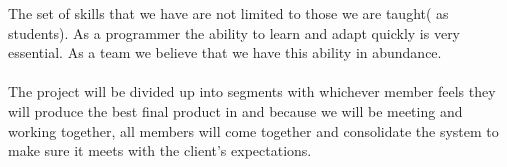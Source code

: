 \documentclass[runningheads,a4paper]{article}
\begin{document}
    The set of skills that we have are not limited to those we are taught( as students). As a programmer the ability to learn and adapt quickly is very essential. As a team we believe that we have this ability in abundance. \\
	
	\\The project will be divided up into segments with whichever member feels they will produce the best final product in and because we will be meeting and working together, all members will come together and consolidate the system to make sure it meets with the client's expectations.

     
     
\end{document}
